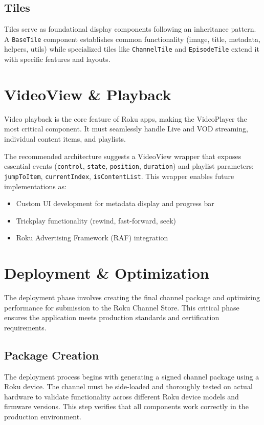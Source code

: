 \documentclass[11pt,letterpaper]{article}
\begin{document}
\subsection{Tiles}
Tiles serve as foundational display components following an inheritance pattern. A \texttt{BaseTile} component establishes common functionality (image, title, metadata, helpers, utils) while specialized tiles like \texttt{ChannelTile} and \texttt{EpisodeTile} extend it with specific features and layouts.


\section{VideoView \& Playback}
Video playback is the core feature of Roku apps, making the VideoPlayer the most critical component. It must seamlessly handle Live and VOD streaming, individual content items, and playlists.

The recommended architecture suggests a VideoView wrapper that exposes essential events (\texttt{control}, \texttt{state}, \texttt{position}, \texttt{duration}) and playlist parameters: \texttt{jumpToItem}, \texttt{currentIndex}, \texttt{isContentList}. This wrapper enables future implementations as:

\begin{itemize}
    \item Custom UI development for metadata display and progress bar
    \item Trickplay functionality (rewind, fast-forward, seek)
    \item Roku Advertising Framework (RAF) integration
\end{itemize}

\section{Deployment \& Optimization}
\label{sec:deployment}

The deployment phase involves creating the final channel package and optimizing performance for submission to the Roku Channel Store. This critical phase ensures the application meets production standards and certification requirements.

\subsection{Package Creation}
The deployment process begins with generating a signed channel package using a Roku device. The channel must be side-loaded and thoroughly tested on actual hardware to validate functionality across different Roku device models and firmware versions. This step verifies that all components work correctly in the production environment.
\end{document}
